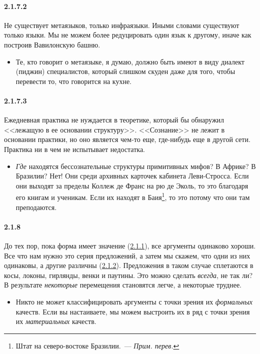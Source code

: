 \paragraph{2.1.7.2}\hypertarget{par:2.1.7.2}{} Не существует метаязыков, только инфраязыки. Иными словами существуют только языки. Мы не можем более редуцировать один язык к другому, иначе как построив Вавилонскую башню. 
	\begin{itemize}
	\item 
	Те, кто говорит о метаязыке, я думаю, должно быть имеют в виду диалект (пиджин) специалистов, который слишком скуден даже для того, чтобы перевести то, что говорится на кухне.
	\end{itemize}

\paragraph{2.1.7.3}\hypertarget{par:2.1.7.3}{} Ежедневная практика не нуждается в теоретике, который бы обнаружил <<лежащую в ее основании структуру>>. <<Сознание>> не лежит в основании практики, но оно является чем-то еще, где-нибудь еще в другой сети. Практика ни в чем не испытывает недостатка. 
	\begin{itemize}
	\item 
	{\itshape Где} находятся бессознательные структуры примитивных мифов? В Африке? В Бразилии? Нет! Они среди архивных карточек кабинета Леви-Стросса. Если они выходят за пределы Коллеж де Франс на рю де Эколь, то это благодаря его книгам и ученикам. Если их находят в Баия\footnote{Штат на северо-востоке Бразилии.~--- {\itshape Прим. перев.}}, то это потому что они там преподаются.
	\end{itemize}

\paragraph{2.1.8}\hypertarget{par:2.1.8}{} До тех пор, пока форма имеет значение (\hyperlink{par:2.1.1}{2.1.1}), все аргументы одинаково хороши.
Все что нам нужно это серия предложений, а затем мы скажем, что одни из них одинаковы, а другие различны (\hyperlink{par:2.1.2}{2.1.2}). Предложения в таком случае сплетаются в косы, локоны, гирлянды, венки и паутины. Это можно сделать {\itshape всегда}, не так ли? В результате {\itshape некоторые} перемещения становятся легче, а некоторые труднее. 
	\begin{itemize}
	\item 
	Никто не может классифицировать аргументы с точки зрения их {\itshape формальных} качеств. Если вы настаиваете, мы можем выстроить их в ряд с точки зрения их {\itshape материальных} качеств.
	\end{itemize}

